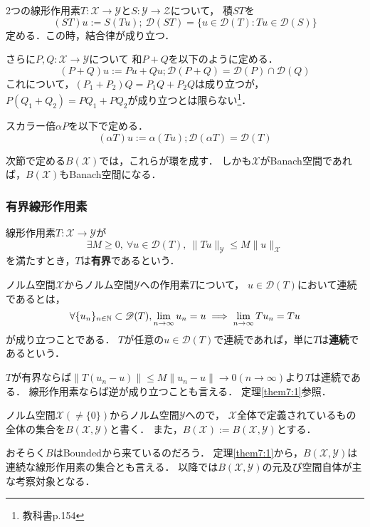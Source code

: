 \documentclass[a4j]{jarticle}
\newcommand{\dom}{\mathscr{D}}
\newcommand{\spX}{\mathscr{X}}
\newcommand{\spY}{\mathscr{Y}}
\begin{document}
    \begin{Def}
        2つの線形作用素$T:\spX \to \spY$と$S:\spY \to \mathscr{Z}$について，
        積$ST$を
        \[ (ST)u:=S(Tu);~ \dom(ST)=\{ u \in \dom(T) : Tu \in \dom(S) \} \]
        定める．この時，結合律が成り立つ．

        さらに$P, Q:\spX \to \spY$について
        和$P+Q$を以下のように定める．
        \[ (P+Q)u:=Pu+Qu; \dom(P+Q)=\dom(P) \cap \dom(Q)  \]
        これについて，$(P_1+P_2)Q=P_1 Q+P_2 Q$は成り立つが，
        $P(Q_1+Q_2)=P Q_1+P Q_2$が成り立つとは限らない\footnote{教科書p.154}．

        スカラー倍$\alpha P$を以下で定める．
        \[ (\alpha T)u:=\alpha (Tu); \dom(\alpha T)=\dom(T) \]
    \end{Def}
    次節で定める$B(\spX)$では，これらが環を成す．
    しかも$\spX$がBanach空間であれば，$B(\spX)$もBanach空間になる．

    \subsubsection{有界線形作用素}
    \begin{Def}
        線形作用素$T:\spX \to \spY$が
        \[ \exists M \geq 0,~ \forall u \in \dom(T),~ \|Tu\|_{\spY} \leq M \|u\|_{\spX} \]
        を満たすとき，$T$は\textbf{有界}であるという．
    \end{Def}

    \begin{Def}
        ノルム空間$\spX$からノルム空間$\spY$への作用素$T$について，
        $u \in \dom(T)$において連続であるとは，
        \[ \forall \{ u_n\}_{n \in \N} \subset \dom(T), \lim_{n \to \infty}u_n=u \implies \lim_{n \to \infty}T u_n=Tu  \]
        が成り立つことである．
        $T$が任意の$u \in \dom(T)$で連続であれば，単に$T$は\textbf{連続}であるという．
    \end{Def}
    $T$が有界ならば$\|T(u_n-u)\| \leq M\|u_n-u\| \to 0(n \to \infty)$より$T$は連続である．
    線形作用素ならば逆が成り立つことも言える．
    定理\ref{them7:1}参照．

    \begin{Def}
        ノルム空間$\spX(\neq \{0\})$からノルム空間$\spY$へので，
        $\spX$全体で定義されているもの全体の集合を$B(\spX, \spY)$と書く．
        また，$B(\spX):=B(\spX, \spY)$とする．
    \end{Def}
    おそらく$B$はBoundedから来ているのだろう．
    定理\ref{them7:1}から，$B(\spX, \spY)$は連続な線形作用素の集合とも言える．
    以降では$B(\spX, \spY)$の元及び空間自体が主な考察対象となる．
\end{document}
